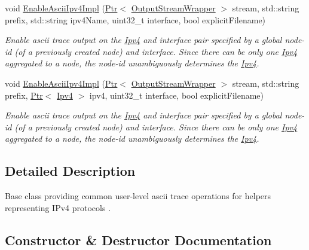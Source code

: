 \begin{DoxyCompactItemize}
void \hyperlink{classns3_1_1AsciiTraceHelperForIpv4_acced6a7ba39a549057f84be7cf420e2f}{Enable\+Ascii\+Ipv4\+Impl} (\hyperlink{classns3_1_1Ptr}{Ptr}$<$ \hyperlink{classns3_1_1OutputStreamWrapper}{Output\+Stream\+Wrapper} $>$ stream, std\+::string prefix, std\+::string ipv4\+Name, uint32\+\_\+t interface, bool explicit\+Filename)
\begin{DoxyCompactList}\small\item\em Enable ascii trace output on the \hyperlink{classns3_1_1Ipv4}{Ipv4} and interface pair specified by a global node-\/id (of a previously created node) and interface. Since there can be only one \hyperlink{classns3_1_1Ipv4}{Ipv4} aggregated to a node, the node-\/id unambiguously determines the \hyperlink{classns3_1_1Ipv4}{Ipv4}. \end{DoxyCompactList}\item 
void \hyperlink{classns3_1_1AsciiTraceHelperForIpv4_a43f6cfb0561f31ccc7e69ccf72abc0a3}{Enable\+Ascii\+Ipv4\+Impl} (\hyperlink{classns3_1_1Ptr}{Ptr}$<$ \hyperlink{classns3_1_1OutputStreamWrapper}{Output\+Stream\+Wrapper} $>$ stream, std\+::string prefix, \hyperlink{classns3_1_1Ptr}{Ptr}$<$ \hyperlink{classns3_1_1Ipv4}{Ipv4} $>$ ipv4, uint32\+\_\+t interface, bool explicit\+Filename)
\begin{DoxyCompactList}\small\item\em Enable ascii trace output on the \hyperlink{classns3_1_1Ipv4}{Ipv4} and interface pair specified by a global node-\/id (of a previously created node) and interface. Since there can be only one \hyperlink{classns3_1_1Ipv4}{Ipv4} aggregated to a node, the node-\/id unambiguously determines the \hyperlink{classns3_1_1Ipv4}{Ipv4}. \end{DoxyCompactList}\end{DoxyCompactItemize}


\subsection{Detailed Description}
Base class providing common user-\/level ascii trace operations for helpers representing I\+Pv4 protocols . 

\subsection{Constructor \& Destructor Documentation}
